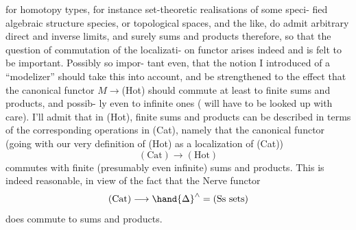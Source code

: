 for homotopy types,  for  instance set-theoretic realisations of some speci-%
fied algebraic structure species, or topological spaces,  and the like,
do admit arbitrary direct and inverse limits,  and surely  sums and
products therefore,  so that the question of commutation of the localizati-%
on functor  arises indeed and is felt to be important.  Possibly so impor-%
tant even,  that the notion I introduced of a ``modelizer'' should take this
into account,  and be strengthened to the effect that the canonical functor
$M\longrightarrow$(Hot)  should commute at least to finite sums and products,  and possib-%
ly even to infinite ones (   will have to be looked up with care).  I'll
admit  that in (Hot),  finite sums and products can be described in terms of
the corresponding operations in (Cat),  namely that the canonical functor
(going with our very definition of (Hot) as a localization of (Cat))
\[ (\mathrm{Cat}) \longrightarrow (\mathrm{Hot}) \]
commutes with finite (presumably even infinite) sums and products. This is
indeed reasonable,  in view of the fact that the Nerve functor
\[ (\mathrm{Cat}) \longrightarrow \hand{\Delta}^{\wedge} = (\mathrm{Ss\ sets}) \]
does commute to sums and products.

